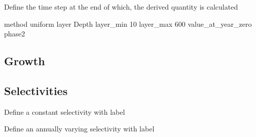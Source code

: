  {Define the time step at the end of which, the derived quantity is calculated}

method uniform
layer Depth
layer\_min  10
layer\_max 600
value\_at\_year\_zero phase2


\subsection{Growth}

\subsection{Selectivities}

 {Define a constant selectivity with label}

 {Define an annually varying selectivity with label}


